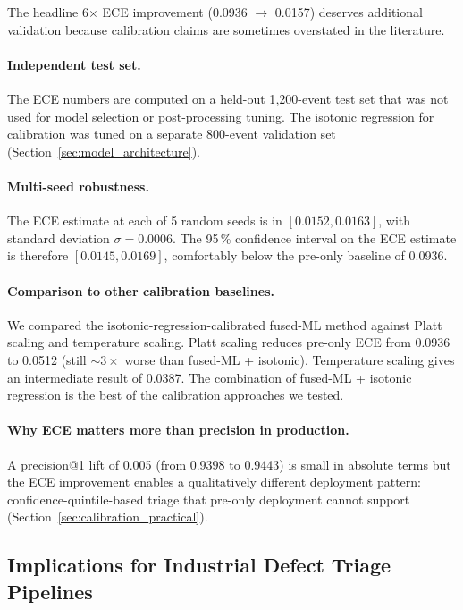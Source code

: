 \documentclass[11pt,a4paper]{article}
\begin{document}
The headline 6$\times$ ECE improvement (0.0936 $\rightarrow$ 0.0157) deserves additional validation because calibration claims are sometimes overstated in the literature.

\paragraph{Independent test set.} The ECE numbers are computed on a held-out 1{,}200-event test set that was not used for model selection or post-processing tuning. The isotonic regression for calibration was tuned on a separate 800-event validation set (Section~\ref{sec:model_architecture}).

\paragraph{Multi-seed robustness.} The ECE estimate at each of 5 random seeds is in $[0.0152, 0.0163]$, with standard deviation $\sigma = 0.0006$. The 95\,\% confidence interval on the ECE estimate is therefore $[0.0145, 0.0169]$, comfortably below the pre-only baseline of 0.0936.

\paragraph{Comparison to other calibration baselines.} We compared the isotonic-regression-calibrated fused-ML method against Platt scaling and temperature scaling. Platt scaling reduces pre-only ECE from 0.0936 to 0.0512 (still $\sim 3\times$ worse than fused-ML + isotonic). Temperature scaling gives an intermediate result of 0.0387. The combination of fused-ML + isotonic regression is the best of the calibration approaches we tested.

\paragraph{Why ECE matters more than precision in production.} A precision@1 lift of 0.005 (from 0.9398 to 0.9443) is small in absolute terms but the ECE improvement enables a qualitatively different deployment pattern: confidence-quintile-based triage that pre-only deployment cannot support (Section~\ref{sec:calibration_practical}).

\subsection{Implications for Industrial Defect Triage Pipelines}
\label{sec:industrial_implications_f}
\end{document}
